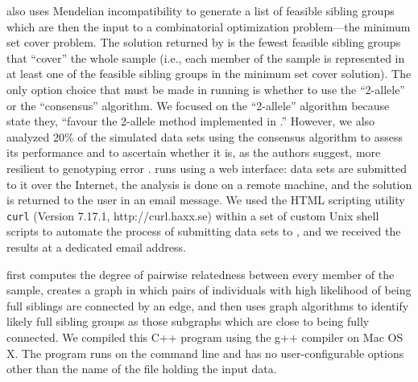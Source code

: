 \kinalyzer{} also uses Mendelian incompatibility to generate a list of feasible sibling groups which 
are then the input to a combinatorial optimization problem---the minimum set cover problem.  The 
solution returned by \kinalyzer{} is the fewest feasible sibling groups that ``cover'' the whole sample 
(i.e., each member of the sample is represented in at least one of the feasible sibling groups in the 
minimum set cover solution). The only option choice that must be made in running \kinalyzer{} is 
whether to use the ``2-allele'' or the ``consensus'' algorithm.  We focused on the ``2-allele'' 
algorithm because \citet{ashley09} state they, ``favour the 2-allele method implemented in 
\kinalyzer{}.''  However, we also analyzed 20\% of the simulated data sets using the consensus 
algorithm \citep{sheik08} to assess its performance and to ascertain whether it is, as the authors 
suggest, more resilient to genotyping error \citep{sheik08_err_tol}.    \kinalyzer{} runs using a web 
interface: data sets are submitted to it over the Internet, the analysis is done on a remote machine, 
and the solution is returned to the user in an email message.  We used the HTML scripting utility {\tt 
curl} (Version 7.17.1, http://curl.haxx.se) within a set of custom Unix shell scripts to automate the 
process of submitting data sets to \kinalyzer{}, and we received the results at a dedicated email 
address.     


\familyfinder{} first computes the degree of pairwise relatedness between every member of the sample, 
creates a graph in which pairs of individuals with high likelihood of being full siblings are connected 
by an edge, and then uses graph algorithms to identify likely full sibling groups as those 
subgraphs which are close to being fully connected.  We compiled this C++ program using the g++ 
compiler on Mac OS X.  The program runs on the command line and has no user-configurable options other 
than the name of the file holding the input data.    


